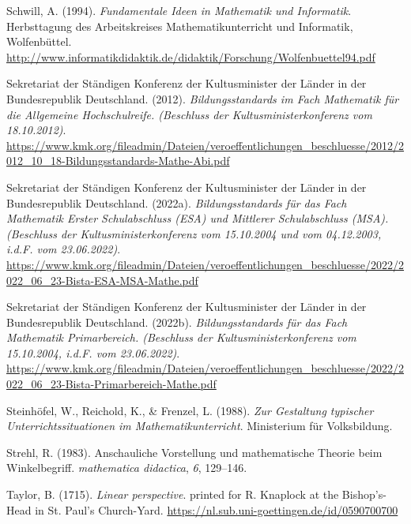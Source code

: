 \documentclass[
]{scrbook}
\newlength{\cslhangindent}
\newenvironment{CSLReferences}[2] %
 {\begin{list}{}{%
  \setlength{\itemindent}{0pt}
  \setlength{\leftmargin}{0pt}
  \setlength{\parsep}{0pt}
  \ifodd #1
   \setlength{\leftmargin}{\cslhangindent}
   \setlength{\itemindent}{-1\cslhangindent}
  \fi
  \setlength{\itemsep}{#2\baselineskip}}}
 {\end{list}}
\theoremstyle{definition}
\theoremstyle{definition}
\theoremstyle{definition}
\theoremstyle{definition}
\theoremstyle{remark}
\begin{document}
\begin{CSLReferences}{1}{0}
Schwill, A. (1994). \emph{Fundamentale {Ideen} in {Mathematik} und {Informatik}}. Herbsttagung des Arbeitskreises Mathematikunterricht und Informatik, Wolfenbüttel. \url{http://www.informatikdidaktik.de/didaktik/Forschung/Wolfenbuettel94.pdf}

Sekretariat der Ständigen Konferenz der Kultusminister der Länder in der Bundesrepublik Deutschland. (2012). \emph{Bildungsstandards im {Fach} {Mathematik} für die {Allgemeine} {Hochschulreife}. (Beschluss der Kultusministerkonferenz vom 18.10.2012)}. \url{https://www.kmk.org/fileadmin/Dateien/veroeffentlichungen_beschluesse/2012/2012_10_18-Bildungsstandards-Mathe-Abi.pdf}

Sekretariat der Ständigen Konferenz der Kultusminister der Länder in der Bundesrepublik Deutschland. (2022a). \emph{Bildungsstandards für das {Fach} {Mathematik} {Erster} {Schulabschluss} ({ESA}) und {Mittlerer} {Schulabschluss} ({MSA}). ({Beschluss} der {Kultusministerkonferenz} vom 15.10.2004 und vom 04.12.2003, i.d.{F}. vom 23.06.2022)}. \url{https://www.kmk.org/fileadmin/Dateien/veroeffentlichungen_beschluesse/2022/2022_06_23-Bista-ESA-MSA-Mathe.pdf}

Sekretariat der Ständigen Konferenz der Kultusminister der Länder in der Bundesrepublik Deutschland. (2022b). \emph{Bildungsstandards für das {Fach} {Mathematik} {Primarbereich}. ({Beschluss} der {Kultusministerkonferenz} vom 15.10.2004, i.d.{F}. vom 23.06.2022)}. \url{https://www.kmk.org/fileadmin/Dateien/veroeffentlichungen_beschluesse/2022/2022_06_23-Bista-Primarbereich-Mathe.pdf}

Steinhöfel, W., Reichold, K., \& Frenzel, L. (1988). \emph{Zur {Gestaltung} typischer {Unterrichtssituationen} im {Mathematikunterricht}}. Ministerium für Volksbildung.

Strehl, R. (1983). Anschauliche {Vorstellung} und mathematische {Theorie} beim {Winkelbegriff}. \emph{mathematica didactica}, \emph{6}, 129--146.

Taylor, B. (1715). \emph{Linear perspective}. printed for R. Knaplock at the Bishop's-Head in St. Paul's Church-Yard. \url{https://nl.sub.uni-goettingen.de/id/0590700700}


\end{CSLReferences}
\end{document}
